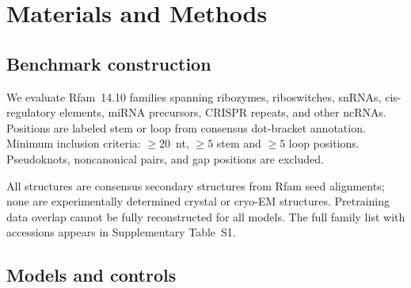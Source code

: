 \documentclass[11pt]{article}
\begin{document}
\section{Materials and Methods}
\label{sec:methods}

\subsection{Benchmark construction}
\label{sec:benchmark}

We evaluate \panelN{} Rfam~14.10 families \citep{kalvari2021rfam} spanning ribozymes, riboswitches, snRNAs,
cis-regulatory elements, miRNA precursors, CRISPR repeats, and other ncRNAs.
Positions are labeled stem or loop from consensus dot-bracket annotation.
Minimum inclusion criteria: $\geq 20$~nt, $\geq 5$ stem and $\geq 5$ loop
positions. Pseudoknots, noncanonical pairs, and gap positions are excluded.

All structures are consensus secondary structures from Rfam seed alignments;
none are experimentally determined crystal or cryo-EM structures. Pretraining
data overlap cannot be fully reconstructed for all models. The full family
list with accessions appears in Supplementary Table~S1.

\subsection{Models and controls}
\label{sec:models}
\end{document}
